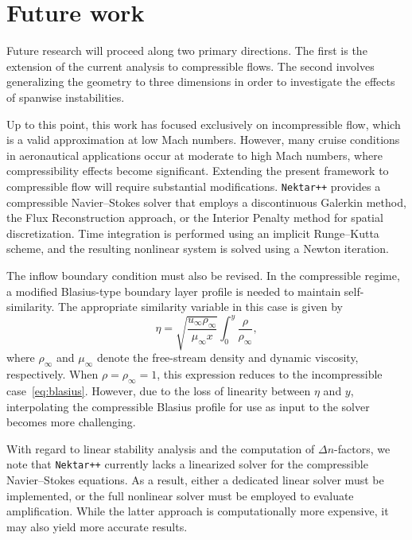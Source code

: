 \documentclass[../main.tex]{subfiles}
\begin{document}
\section{Future work}\label{sec:future_work}

Future research will proceed along two primary directions. The first is the extension of the current analysis to compressible flows. The second involves generalizing the geometry to three dimensions in order to investigate the effects of spanwise instabilities.

Up to this point, this work has focused exclusively on incompressible flow, which is a valid approximation at low Mach numbers. However, many cruise conditions in aeronautical applications occur at moderate to high Mach numbers, where compressibility effects become significant. Extending the present framework to compressible flow will require substantial modifications. \texttt{Nektar++} provides a compressible Navier--Stokes solver that employs a discontinuous Galerkin method, the Flux Reconstruction approach, or the Interior Penalty method for spatial discretization. Time integration is performed using an implicit Runge--Kutta scheme, and the resulting nonlinear system is solved using a Newton iteration.

The inflow boundary condition must also be revised. In the compressible regime, a modified Blasius-type boundary layer profile is needed to maintain self-similarity. The appropriate similarity variable in this case is given by~\cite{boundaryLayerTheory,juliacomNSBlasius}
\begin{equation}
	\eta = \sqrt{\frac{u_\infty \rho_\infty}{\mu_\infty x}} \int_0^y \frac{\rho}{\rho_\infty},
	\label{eq:etacompressible}
\end{equation}
where $\rho_\infty$ and $\mu_\infty$ denote the free-stream density and dynamic viscosity, respectively. When $\rho = \rho_\infty = 1$, this expression reduces to the incompressible case~\cref{eq:blasius}. However, due to the loss of linearity between $\eta$ and $y$, interpolating the compressible Blasius profile for use as input to the solver becomes more challenging.

With regard to linear stability analysis and the computation of $\Delta n$-factors, we note that \texttt{Nektar++} currently lacks a linearized solver for the compressible Navier--Stokes equations. As a result, either a dedicated linear solver must be implemented, or the full nonlinear solver must be employed to evaluate amplification. While the latter approach is computationally more expensive, it may also yield more accurate results.
\end{document}
